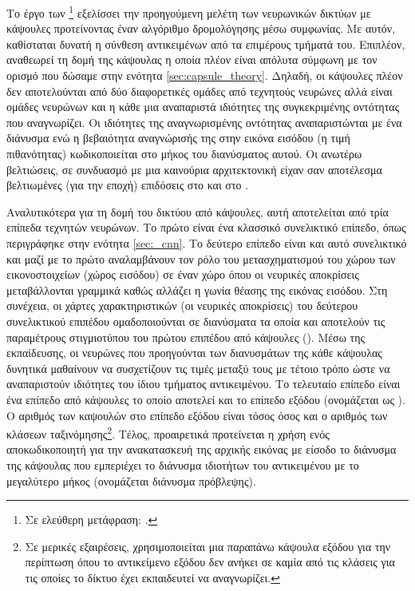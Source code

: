 Το έργο των \footnote{Σε ελεύθερη μετάφραση: .} \cite{sabour2017dynamic} εξελίσσει την προηγούμενη μελέτη των νευρωνικών δικτύων με κάψουλες προτείνοντας έναν αλγόριθμο δρομολόγησης μέσω συμφωνίας. Με αυτόν, καθίσταται δυνατή η σύνθεση αντικειμένων από τα επιμέρους τμήματά του. Επιπλέον, αναθεωρεί τη δομή της κάψουλας η οποία πλέον είναι απόλυτα σύμφωνη με τον ορισμό που δώσαμε στην ενότητα \ref{sec:capsule_theory}. Δηλαδή, οι κάψουλες πλέον δεν αποτελούνται από δύο διαφορετικές ομάδες από τεχνητούς νευρώνες αλλά είναι ομάδες νευρώνων και η κάθε μια αναπαριστά ιδιότητες της συγκεκριμένης οντότητας που αναγνωρίζει. Οι ιδιότητες της αναγνωρισμένης οντότητας αναπαριστώνται με ένα διάνυσμα ενώ η βεβαιότητα αναγνώρισής της στην εικόνα εισόδου (η τιμή πιθανότητας) κωδικοποιείται στο μήκος του διανύσματος αυτού. Οι ανωτέρω βελτιώσεις, σε συνδυασμό με μια καινούρια αρχιτεκτονική είχαν σαν αποτέλεσμα βελτιωμένες (για την εποχή) επιδόσεις στο \cite{lecun1998gradientMNIST} και στο \cite{sabour2017dynamic}.\par

Αναλυτικότερα για τη δομή του δικτύου από κάψουλες, αυτή αποτελείται από τρία επίπεδα τεχνητών νευρώνων. Το πρώτο είναι ένα κλασσικό συνελικτικό επίπεδο, όπως περιγράφηκε στην ενότητα \ref{sec:_cnn}. Το δεύτερο επίπεδο είναι και αυτό συνελικτικό και μαζί με το πρώτο αναλαμβάνουν τον ρόλο του μετασχηματισμού του χώρου των εικονοστοιχείων (χώρος εισόδου) σε έναν χώρο όπου οι νευρικές αποκρίσεις μεταβάλλονται γραμμικά καθώς αλλάζει η γωνία θέασης της εικόνας εισόδου. Στη συνέχεια, οι χάρτες χαρακτηριστικών (οι νευρικές αποκρίσεις) του δεύτερου συνελικτικού επιπέδου ομαδοποιούνται σε διανύσματα τα οποία και αποτελούν τις παραμέτρους στιγμιοτύπου του πρώτου επιπέδου από κάψουλες (). Μέσω της εκπαίδευσης, οι νευρώνες που προηγούνται των διανυσμάτων της κάθε κάψουλας δυνητικά μαθαίνουν να συσχετίζουν τις τιμές μεταξύ τους με τέτοιο τρόπο ώστε να αναπαριστούν ιδιότητες του ίδιου τμήματος αντικειμένου. Το τελευταίο επίπεδο είναι ένα επίπεδο από κάψουλες το οποίο αποτελεί και το επίπεδο εξόδου (ονομάζεται ως ). Ο αριθμός των καψουλών στο επίπεδο εξόδου είναι τόσος όσος και ο αριθμός των κλάσεων ταξινόμησης\footnote{Σε μερικές εξαιρέσεις, χρησιμοποιείται μια παραπάνω κάψουλα εξόδου για την περίπτωση όπου το αντικείμενο εξόδου δεν ανήκει σε καμία από τις κλάσεις για τις οποίες το δίκτυο έχει εκπαιδευτεί να αναγνωρίζει.}. Τέλος, προαιρετικά προτείνεται η χρήση ενός αποκωδικοποιητή για την ανακατασκευή της αρχικής εικόνας με είσοδο το διάνυσμα της κάψουλας που εμπεριέχει το διάνυσμα ιδιοτήτων του αντικειμένου με το μεγαλύτερο μήκος (ονομάζεται διάνυσμα πρόβλεψης).\par


